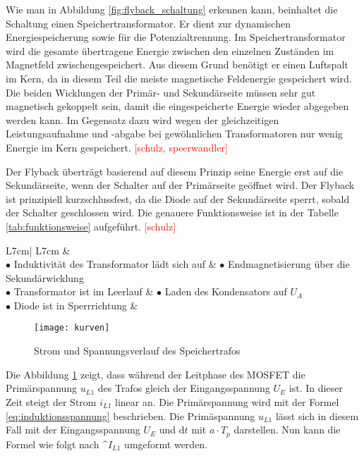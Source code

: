 Wie man in Abbildung \ref{fig:flyback_schaltung} erkennen kann, beinhaltet die Schaltung einen Speichertransformator. Er dient zur dynamischen Energiespeicherung sowie für die Potenzialtrennung. Im Speichertransformator wird die gesamte übertragene Energie zwischen den einzelnen Zuständen im Magnetfeld zwischengespeichert. Aus diesem Grund benötigt er einen Luftspalt im Kern, da in diesem Teil die meiste magnetische Feldenergie gespeichert wird. Die beiden Wicklungen der Primär- und Sekundärseite müssen sehr gut magnetisch gekoppelt sein, damit die eingespeicherte Energie wieder abgegeben werden kann. Im Gegensatz dazu wird wegen der gleichzeitigen Leistungsaufnahme und -abgabe bei gewöhnlichen Transformatoren nur wenig Energie im Kern gespeichert.  \textcolor{red}{[schulz, speerwandler]}

Der Flyback überträgt basierend auf diesem Prinzip seine Energie erst auf die Sekundärseite, wenn der Schalter auf der Primärseite geöffnet wird. Der Flyback ist prinzipiell kurzschlussfest, da die Diode auf der Sekundärseite sperrt, sobald der Schalter geschlossen wird. Die genauere Funktionsweise ist in der Tabelle \ref{tab:funktionsweise} aufgeführt. \textcolor{red}{[schulz]}

\begin{table}[H]
	\centering
	\begin{tabular}{L{7cm}| L{7cm} }
		&  \\ \hline\hline
		$ \bullet $ Induktivität des Transformator lädt sich auf & $ \bullet $ Endmagnetisierung über die Sekundärwicklung \\ 
		$ \bullet $ Transformator ist im Leerlauf & $ \bullet $ Laden des Kondensators auf $ U_{A} $ \\ 
		$ \bullet $ Diode ist in Sperrrichtung &  \\ \hline
	\end{tabular}
	\caption{Funktionsweise des Flybacks \textcolor{red}{[schulz]}}\label{tab:funktionsweise}
\end{table}

\begin{figure}[H]
	\centering
	\texttt{[image: kurven]}
	\caption{Strom und Spannungsverlauf des Speichertrafos}\label{fig:kurven}
\end{figure}

Die Abbildung \ref{fig:kurven} zeigt, dass während der Leitphase des MOSFET die Primärspannung $ u_{L1} $ des Trafos gleich der Eingangsspannung $ U_{E} $ ist. In dieser Zeit steigt der Strom $ i_{L1} $ linear an. Die Primärspannung wird mit der Formel \ref{eq:induktionsspannung} beschrieben. Die Primäspannung $ u_{L1} $ lässt sich in diesem Fall mit der Eingangsspannung $ U_{E} $  und $ \mathrm{d} t $ mit $ a \cdot T_{p} $ darstellen. Nun kann die Formel wie folgt nach $ \^{I}_{L1} $ umgeformt werden.


